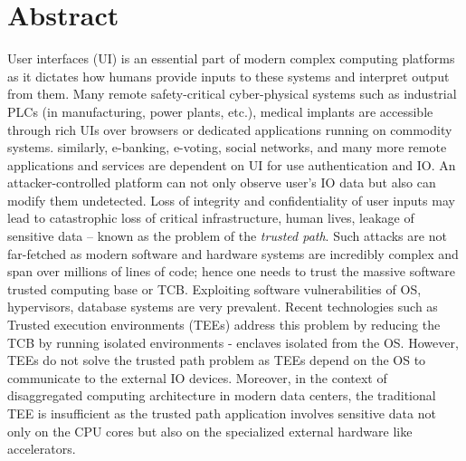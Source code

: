 \begingroup
\let\clearpage\relax
\let\cleardoublepage\relax
\let\cleardoublepage\relax

\chapter*{Abstract}

User interfaces (UI) is an essential part of modern complex computing platforms as it dictates how humans provide inputs to these systems and interpret output from them. Many remote safety-critical cyber-physical systems such as industrial PLCs (in manufacturing, power plants, etc.), medical implants are accessible through rich UIs over browsers or dedicated applications running on commodity systems. similarly, e-banking, e-voting, social networks, and many more remote applications and services are dependent on UI for use authentication and IO. An attacker-controlled platform can not only observe user's IO data but also can modify them undetected. Loss of integrity and confidentiality of user inputs may lead to catastrophic loss of critical infrastructure, human lives, leakage of sensitive data -- known as the problem of the \emph{trusted path}. Such attacks are not far-fetched as modern software and hardware systems are incredibly complex and span over millions of lines of code; hence one needs to trust the massive software trusted computing base or TCB. Exploiting software vulnerabilities of OS, hypervisors, database systems are very prevalent. Recent technologies such as Trusted execution environments (TEEs) address this problem by reducing the TCB by running isolated environments - enclaves isolated from the OS. However, TEEs do not solve the trusted path problem as TEEs depend on the OS to communicate to the external IO devices. Moreover, in the context of disaggregated computing architecture in modern data centers, the traditional TEE is insufficient as the trusted path application involves sensitive data not only on the CPU cores but also on the specialized external hardware like accelerators.


